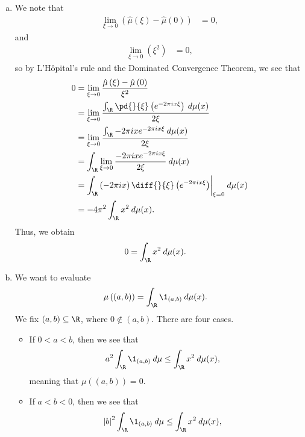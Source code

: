 \documentclass[10pt]{mypackage}
\begin{document}
\begin{enumerate}[(a)]
  \item We note that
    \begin{align*}
      \lim_{\xi\rightarrow 0} \left( \hat{\mu}\left( \xi \right) - \hat{\mu}\left( 0 \right) \right) &= 0,
    \end{align*}
    and
    \begin{align*}
      \lim_{\xi\rightarrow 0} \left( \xi^2 \right) &= 0,
    \end{align*}
    so by L'Hôpital's rule and the Dominated Convergence Theorem, we see that
    \begin{align*}
      0 &= \lim_{\xi\rightarrow 0} \frac{\hat{\mu}\left( \xi \right) - \hat{\mu}\left( 0 \right)}{\xi^2}\\
        &= \lim_{\xi\rightarrow 0} \frac{ \int_{\R}^{} \pd{}{\xi}\left( e^{-2\pi i x \xi} \right)\:d\mu(x) }{2\xi}\\
        &= \lim_{\xi\rightarrow 0} \frac{ \int_{\R}^{} -2\pi i x e^{-2\pi i x \xi}\:d\mu(x) }{2\xi}\\
        &= \int_{\R}^{} \lim_{\xi\rightarrow 0} \frac{-2\pi i x e^{-2\pi i x \xi}}{2\xi}\:d\mu(x)\\
        &= \int_{\R}^{} \left( -2\pi i x \right)\diff{}{\xi}\left( e^{-2\pi i x \xi} \right)\biggr\vert_{\xi = 0}\:d\mu(x)\\
        &= -4\pi^2 \int_{\R}^{} x^2 \:d\mu(x).
    \end{align*}
    Thus, we obtain
    \begin{align*}
      0 &= \int_{\R}^{} x^2\:d\mu(x).
    \end{align*}
  \item We want to evaluate
    \begin{align*}
      \mu\left( (a,b) \right) &= \int_{\R}^{} \1_{(a,b)}\:d\mu(x).
    \end{align*}
    We fix $(a,b)\subseteq \R$, where $0\notin (a,b)$. There are four cases.
    \begin{itemize}
      \item If $0 < a < b$, then we see that
        \begin{align*}
          a^2 \int_{\R}^{} \1_{(a,b)}\:d\mu &\leq \int_{\R}^{} x^2\:d\mu(x),
        \end{align*}
        meaning that $\mu\left( (a,b) \right) = 0$.
      \item If $a < b < 0$, then we see that
        \begin{align*}
          \left\vert b \right\vert^2 \int_{\R}^{} \1_{(a,b)}\:d\mu &\leq \int_{\R}^{} x^2\:d\mu(x),

\end{align*}
\end{itemize}
\end{enumerate}
\end{document}
